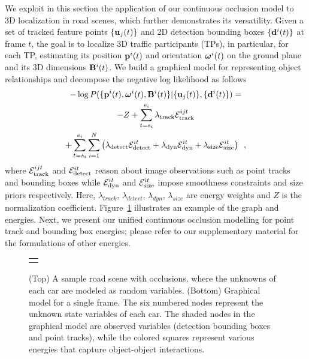 We exploit in this section the application of our continuous occlusion model to 3D localization in road scenes, which further demonstrates its versatility. Given a set of tracked feature points $\{\mathbf{u}_j(t)\}$ and 2D detection bounding boxes $\{\mathbf{d}^{i}(t)\}$ at frame $t$, the goal is to localize 3D traffic participants (TPs), in particular, for each TP, estimating its position $\mathbf{p}^i(t)$ and orientation $\bm{\omega}^i(t)$ on the ground plane and its 3D dimensions $\mathbf{B}^i(t)$. We build a graphical model for representing object relationships and decompose the negative log likelihood as follows
%
\begin{multline}
  -\log{P(\{ \mathbf{p}^i(t) , \bm{\omega}^i(t) , \mathbf{B}^i(t) \} | \{\mathbf{u}_j(t)\} , \{\mathbf{d}^{i}(t)\} )} = \\
  -Z 
   + \sum_{t=s_i}^{e_i} \lambda_{\text{track}}\mathcal{E}^{ijt}_{\text{track}}
  \\
  + 
  \sum_{t=s_i}^{e_i}
  \sum_{i=1}^N  
  \left( 
  \lambda_{\text{detect}}\mathcal{E}^{it}_{\text{detect}}
  + \lambda_{\text{dyn}}\mathcal{E}^{it}_{\text{dyn}}
  + \lambda_{\text{size}}\mathcal{E}^{it}_{\text{size}}
\right)
  \enspace,
\end{multline}
%
where $\mathcal{E}^{ijt}_{\text{track}}$ and $\mathcal{E}^{it}_{\text{detect}}$ reason about image observations such as point tracks and bounding boxes while $\mathcal{E}^{it}_{\text{dyn}}$  and $\mathcal{E}^{it}_{\text{size}}$ impose smoothness constraints and size priors respectively. Here, $\lambda_{track}$, $\lambda_{detect}$, $\lambda_{dyn}$, $\lambda_{size}$ are energy weights and $Z$ is the normalization coefficient. Figure~\ref{fig:graphmodel} illustrates an example of the graph and energies. Next, we present our unified continuous occlusion modelling for point track and bounding box energies; please refer to our supplementary material for the formulations of other energies.

\begin{figure}
  \centering
  \begin{tabular}{c}
    \newcommand{\imagewidth}{7.5cm}
     \\
    
  \end{tabular}
  \caption{\small (Top) A sample road scene with occlusions, where the unknowns of each car are modeled as random variables. (Bottom) Graphical model for a single frame. The six numbered nodes represent the unknown state variables of each car. The shaded nodes in the graphical model are observed variables (detection bounding boxes and point tracks), while the colored squares represent various energies that capture object-object interactions.}
  \label{fig:graphmodel}
\end{figure}



